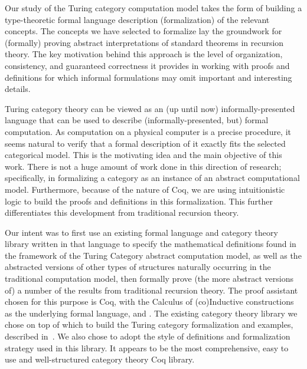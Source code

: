 \documentclass{entcs} \usepackage{entcsmacro}
\begin{document}
Our study of the Turing category computation model takes the form of building a type-theoretic formal language description (formalization) of the relevant concepts. The concepts we have selected to formalize lay the groundwork for (formally) proving abstract interpretations of standard theorems in recursion theory. The key motivation behind  this approach is the level of organization, consistency, and guaranteed correctness it provides in working with proofs and definitions for which informal formulations may omit important and interesting details. 


Turing category theory can be viewed as an (up until now) informally-presented language that can be used to describe (informally-presented, but) formal computation. As computation on a physical computer is a precise procedure, it seems natural to verify that a formal description of it exactly fits the selected categorical model. This is the motivating idea and the main objective of this work. There is not a huge amount of work done in this direction of research; specifically, in formalizing a category as an instance of an abstract computational model. Furthermore, because of the nature of Coq, we are using intuitionistic logic to build the proofs and definitions in this formalization.  This further differentiates this development from traditional recursion theory.   

Our intent was to first use an existing formal language and category theory library written in that language to specify the mathematical definitions found in the framework of the Turing Category abstract computation model, as well as the abstracted versions of other types of structures naturally occurring in the traditional computation model, then formally prove (the more abstract versions of) a number of the results from traditional recursion theory. The proof assistant chosen for this purpose is Coq, with the Calculus of (co)Inductive constructions as the underlying formal language, and . The existing category theory library we chose on top of which to build the Turing category formalization and examples, described in~\cite{timanyNewLib}. We also chose to adopt the style of definitions and formalization strategy used in this library. It appears to be the most comprehensive, easy to use and well-structured category theory Coq library. 
\end{document}
